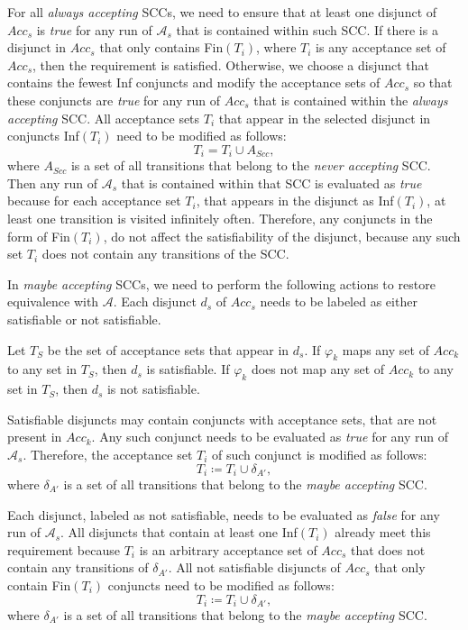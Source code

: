 \documentclass[
  digital, %
  twoside, %
  table,   %
  lof,     %
  lot,     %
]{fithesis3}
\begin{document}
For all \emph{always accepting} SCCs, we need to ensure that at least one disjunct of $Acc_s$ is \emph{true} for any run of $\mathcal{A}_s$ that is contained within such SCC. If there is a disjunct in $Acc_s$ that only contains Fin$(T_i)$, where $T_i$ is any acceptance set of $Acc_s$, then the requirement is satisfied. Otherwise, we choose a disjunct that contains the fewest Inf conjuncts and modify the acceptance sets of $Acc_s$ so that these conjuncts are \emph{true} for any run of $Acc_s$ that is contained within the \emph{always accepting} SCC. All acceptance sets $T_i$ that appear in the selected disjunct in conjuncts Inf$(T_i)$ need to be modified as follows:
\begin{equation*}
  T_i = T_i \cup A_{Scc},
\end{equation*}
where $A_{Scc}$ is a set of all transitions that belong to the \emph{never accepting} SCC. Then any run of $\mathcal{A}_s$ that is contained within that SCC is evaluated as \emph{true} because for each acceptance set $T_i$, that appears in the disjunct as Inf$(T_i)$, at least one transition is visited infinitely often. Therefore, any conjuncts in the form of Fin$(T_i)$, do not affect the satisfiability of the disjunct, because any such set $T_i$ does not contain any transitions of the SCC.

In \emph{maybe accepting} SCCs, we need to perform the following actions to restore equivalence with $\mathcal{A}$. Each disjunct $d_s$ of $Acc_s$ needs to be labeled as either satisfiable or not satisfiable.

Let $T_S$ be the set of acceptance sets that appear in $d_s$. If $\varphi_k$  maps any set of $Acc_k$ to any set in $T_S$, then $d_s$ is satisfiable. If $\varphi_k$  does not map any set of $Acc_k$ to any set in $T_S$, then $d_s$ is not satisfiable.

Satisfiable disjuncts may contain conjuncts with acceptance sets, that are not present in $Acc_k$. Any such conjunct needs to be evaluated as \emph{true} for any run of $\mathcal{A}_s$. Therefore, the acceptance set $T_i$ of such conjunct is modified as follows:
\begin{equation*}
  T_i \coloneqq T_i \cup \delta_{A'},
\end{equation*}
where $\delta_{A'}$ is a set of all transitions that belong to the \emph{maybe accepting} SCC. 

Each disjunct, labeled as not satisfiable, needs to be evaluated as \emph{false} for any run of $\mathcal{A}_s$. All disjuncts that contain at least one Inf$(T_i)$ already meet this requirement because $T_i$ is an arbitrary acceptance set of $Acc_s$ that does not contain any transitions of $\delta_{A'}$. All not satisfiable disjuncts of $Acc_s$ that only contain Fin$(T_i)$ conjuncts need to be modified as follows:
\begin{equation*}
  T_i \coloneqq T_i \cup \delta_{A'},
\end{equation*}
where $\delta_{A'}$ is a set of all transitions that belong to the \emph{maybe accepting} SCC. 
\end{document}

